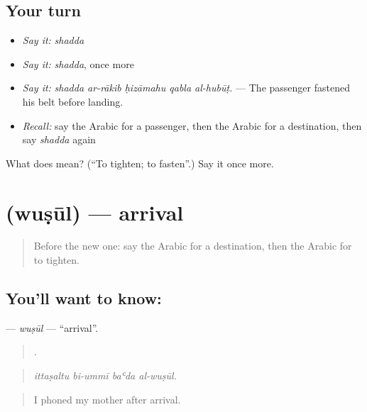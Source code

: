 \subsection*{Your turn}
\begin{itemize}
\raggedright
  \item \emph{Say it:} \emph{shadda}
  \item \emph{Say it:} \emph{shadda}, once more
  \item \emph{Say it:} \emph{shadda ar-rākib ḥizāmahu qabla al-hubūṭ.} — The passenger fastened his belt before landing.
  \item \emph{Recall:} say the Arabic for a passenger, then the Arabic for a destination, then say \emph{shadda} again
\end{itemize}

\begin{tcolorbox}[breakable,colback=teal!4,colframe=teal!35!black,title={Before you move on}]
What does  mean? (\textquotedblleft{}To tighten; to fasten\textquotedblright{}.) Say it once more.
\end{tcolorbox}
\section[\texorpdfstring{\ar{وصول} (wuṣūl)}{وصول (wuṣūl)}]{ (wuṣūl) — arrival}

\label{lesson:AR-C425-wusul}



\begin{quote}
Before the new one: say the Arabic for a destination, then the Arabic for to tighten.
\end{quote}

\subsection*{You'll want to know: }
\textbf{} — \emph{wuṣūl} — \textquotedblleft{}arrival\textquotedblright{}.

\begin{quote}
   .
\end{quote}

\begin{quote}
\emph{ittaṣaltu bi-ummī baʿda al-wuṣūl.}
\end{quote}

\begin{quote}
I phoned my mother after arrival.
\end{quote}

